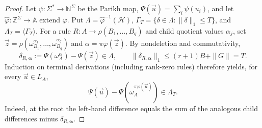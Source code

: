 \documentclass[11pt]{article}
\numberwithin{equation}{section}
\theoremstyle{plain}
\theoremstyle{definition}
\theoremstyle{remark}
\newcommand{\tuple}[1]{\vec{#1}}
\theoremstyle{plain}
\begin{document}
\begin{proof}
Let $\psi:\Sigma^*\to\mathbb N^\Sigma$ be the Parikh map,
$\Psi(\tuple u)=\sum_i\psi(u_i)$, and let
$\widehat\varphi:\mathbb Z^\Sigma\to\mathbb A$ extend $\varphi$.
Put $\Lambda=\widehat\varphi^{-1}(\mathcal H)$,
$\Gamma_T=\{\delta\in\Lambda:\|\delta\|_1\le T\}$, and
$\Lambda_T=\langle\Gamma_T\rangle$.
For a rule $R:A\to\rho(B_1,\ldots,B_q)$ and child quotient
values $\alpha_j$, set
$\tuple z=\rho(\omega_{B_1}^{\alpha_1},\ldots,
\omega_{B_q}^{\alpha_q})$ and
$\alpha=\pi\varphi(\tuple z)$. By nondeletion and commutativity,
\[
 \delta_{R,\boldsymbol\alpha}
 :=\Psi(\omega_A^\alpha)-\Psi(\tuple z)\in\Lambda,\qquad
 \|\delta_{R,\boldsymbol\alpha}\|_1
 \le (r+1)B+\|G\|=T.
\]
Induction on terminal derivations (including rank-zero rules)
therefore yields, for every $\tuple u\in L_A$,
\[
 \Psi(\tuple u)-\Psi(\omega_A^{\pi\varphi(\tuple u)})
 \in\Lambda_T.                                           \tag{1}
\]
Indeed, at the root the left-hand difference equals the sum of
the analogous child differences minus
$\delta_{R,\boldsymbol\alpha}$.


\end{proof}
\end{document}
